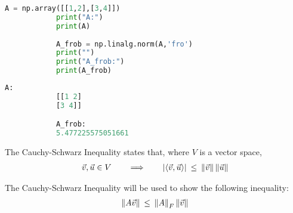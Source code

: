 \begin{example}
\begin{tcolorbox}[sharp corners, colback=black!5!white, colframe=black!75!black, fontupper=\color{black}]
\begin{lstlisting}[language=python, gobble = 12]
            A = np.array([[1,2],[3,4]])
            print("A:")
            print(A)
            
            A_frob = np.linalg.norm(A,'fro')
            print("")
            print("A_frob:")
            print(A_frob)
        \end{lstlisting}
    \end{tcolorbox}

    \begin{tcolorbox}[sharp corners, colback=green!10!white, colframe=black!75!black, fontupper=\color{black}]
        \begin{lstlisting}[language=python, gobble = 12]
            A:
            [[1 2]
            [3 4]]

            A_frob:
            5.477225575051661
        \end{lstlisting}
    \end{tcolorbox}
\end{example}

\begin{theorem}
    The Cauchy-Schwarz Inequality states that, where $V$ is a vector space, 
    \begin{align*}
        \vec{v}, \vec{u} \in V \hspace{20pt} \Longrightarrow \hspace{20pt} \lvert \langle \vec{v} , \vec{u} \rangle \rvert \hspace{2pt} \leq \hspace{2pt} \left\lVert\vec{v}\right\rVert \left\lVert\vec{u}\right\rVert
    \end{align*}
\end{theorem}

The Cauchy-Schwarz Inequality will be used to show the following inequality:
\begin{align*}
    \left\lVert A\vec{v}\right\rVert \hspace{2pt} \leq \hspace{2pt} \left\lVert A\right\rVert_{F} \left\lVert\vec{v}\right\rVert
\end{align*}

